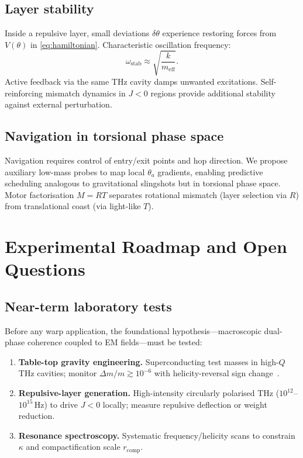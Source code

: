 \documentclass[dvipdfmx,a4paper]{article}
\theoremstyle{definition}
\begin{document}
\subsection{Layer stability}

Inside a repulsive layer, small deviations $\delta\theta$ experience restoring forces from $V(\theta)$ in \eqref{eq:hamiltonian}. Characteristic oscillation frequency:
\begin{equation}
\omega_{\mathrm{stab}} \approx \sqrt{\frac{k}{m_{\mathrm{eff}}}}.
\end{equation}
Active feedback via the same THz cavity damps unwanted excitations. Self-reinforcing mismatch dynamics in $J<0$ regions provide additional stability against external perturbation.

\subsection{Navigation in torsional phase space}

Navigation requires control of entry/exit points and hop direction. We propose auxiliary low-mass probes to map local $\theta_a$ gradients, enabling predictive scheduling analogous to gravitational slingshots but in torsional phase space. Motor factorisation $M=RT$ separates rotational mismatch (layer selection via $R$) from translational coast (via light-like $T$).

\section{Experimental Roadmap and Open Questions}
\label{sec:roadmap}

\subsection{Near-term laboratory tests}

Before any warp application, the foundational hypothesis---macroscopic dual-phase coherence coupled to EM fields---must be tested:
\begin{enumerate}[leftmargin=2em]
  \item \textbf{Table-top gravity engineering.} Superconducting test masses in high-$Q$ THz cavities; monitor $\Delta m/m\gtrsim 10^{-6}$ with helicity-reversal sign change~\cite{dual2025}.
  \item \textbf{Repulsive-layer generation.} High-intensity circularly polarised THz ($10^{12}$--$10^{15}\,\mathrm{Hz}$) to drive $J<0$ locally; measure repulsive deflection or weight reduction.
  \item \textbf{Resonance spectroscopy.} Systematic frequency/helicity scans to constrain $\kappa$ and compactification scale $r_{\mathrm{comp}}$.
\end{enumerate}
\end{document}
